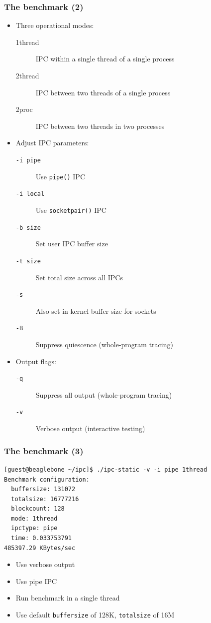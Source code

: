 \begin{frame}
  \frametitle{The benchmark (2)}

  \begin{itemize}
    \item Three operational modes:
    \begin{description}
      \item[1thread] IPC within a single thread of a single process
      \item[2thread] IPC between two threads of a single process
      \item[2proc] IPC between two threads in two processes
    \end{description}
    \pause
    \item Adjust IPC parameters:
    \begin{description}
      \item[\texttt{-i pipe}] Use \texttt{pipe()} IPC
      \item[\texttt{-i local}] Use \texttt{socketpair()} IPC
      \item[\texttt{-b size}] Set user IPC buffer size
      \item[\texttt{-t size}] Set total size across all IPCs
      \item[\texttt{-s}] Also set in-kernel buffer size for sockets
      \item[\texttt{-B}] Suppress quiescence (whole-program tracing)
    \end{description}
    \pause
    \item Output flags:
    \begin{description}
      \item[\texttt{-q}] Suppress all output (whole-program tracing)
      \item[\texttt{-v}] Verbose output (interactive testing)
    \end{description}
  \end{itemize}
\end{frame}

\begin{frame}[fragile]
  \frametitle{The benchmark (3)}

  \begin{small}
\begin{verbatim}
[guest@beaglebone ~/ipc]$ ./ipc-static -v -i pipe 1thread
Benchmark configuration:
  buffersize: 131072
  totalsize: 16777216
  blockcount: 128
  mode: 1thread
  ipctype: pipe
  time: 0.033753791
485397.29 KBytes/sec
\end{verbatim}
  \end{small}

  \begin{itemize}
    \item Use verbose output
    \item Use pipe IPC
    \item Run benchmark in a single thread
    \item Use default \texttt{buffersize} of 128K, \texttt{totalsize} of 16M
  \end{itemize}
\end{frame}

